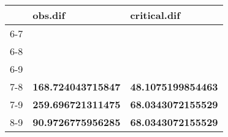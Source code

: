 \begin{table}[ht]
\centering
\begin{tabular}{rll}
  \hline
 & obs.dif & critical.dif \\ 
  \hline
6-7 &  &  \\ 
  6-8 &  &  \\ 
  6-9 &  &  \\ 
  7-8 & \textbf{168.724043715847} & \textbf{48.1075199854463} \\ 
  7-9 & \textbf{259.696721311475} & \textbf{68.0343072155529} \\ 
  8-9 & \textbf{90.9726775956285} & \textbf{68.0343072155529} \\ 
   \hline
\end{tabular}
\end{table}
